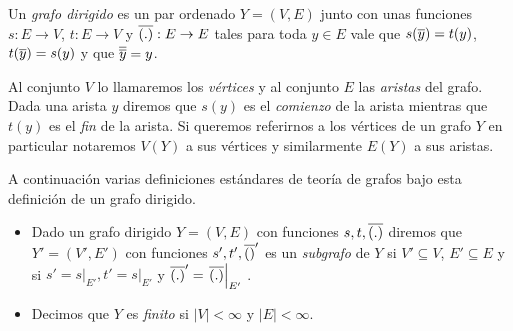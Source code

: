 \documentclass[tesis.tex]{subfiles}
\begin{document}
\begin{deff}
	Un \emph{grafo dirigido} es un par ordenado $Y= (V,E)$ junto con unas funciones
	$s:E \to V$, $t:E \to V$ y $\overline{(.)}:E \to E$ tales para toda $y \in E$ vale que $s(\overline{y}) = t(y)$, $t(\overline y) = s(y)$ y que $\overline{\overline y} = y$.
	
	Al conjunto $V$ lo llamaremos los \emph{vértices} y al conjunto $E$ las \emph{aristas} del grafo.
	Dada una arista $y$ diremos que $s(y)$ es el \emph{comienzo} de la arista mientras que $t(y)$ es el \emph{fin} de la arista.
	Si queremos referirnos a los vértices de un grafo $Y$ en particular notaremos $V(Y)$ a sus vértices y similarmente $E(Y)$ a sus aristas.
	
	
	 
	
%	
%	

	
	
	
	A continuación varias definiciones estándares de teoría de grafos bajo esta definición de un grafo dirigido.
	\begin{itemize}

		\item Dado un grafo dirigido $Y=(V,E)$ con funciones $s,t, \overline{(.)}$ diremos que $Y'=(V',E')$ con funciones $s',t',\overline{()}'$ es un \emph{subgrafo} de $Y$ si $V' \subseteq V$, $E' \subseteq E$ y si $s'=\left. s \right|_{E'}, t' = \left. s \right|_{E'}$ y $\overline{(.)}' = \left. \overline{(.)} \right|_{E'}$ .
		
		\item Decimos que $Y$ es \emph{finito} si $|V| < \infty$ y $|E| < \infty$.	
		

\end{itemize}
\end{deff}
\end{document}
